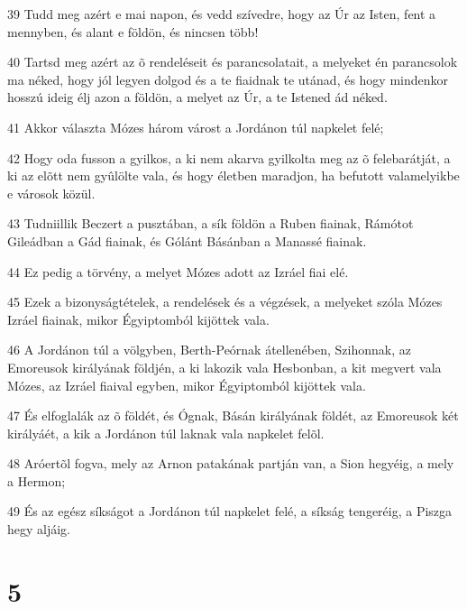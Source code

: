 \par 39 Tudd meg azért e mai napon, és vedd szívedre, hogy az Úr az Isten, fent a mennyben, és alant e földön, és nincsen több!
\par 40 Tartsd meg azért az õ rendeléseit és parancsolatait, a melyeket én parancsolok ma néked, hogy jól legyen dolgod és a te fiaidnak te utánad, és hogy mindenkor hosszú ideig élj azon a földön, a melyet az Úr, a te Istened ád néked.
\par 41 Akkor választa Mózes három várost a Jordánon túl napkelet felé;
\par 42 Hogy oda fusson a gyilkos, a ki nem akarva gyilkolta meg az õ felebarátját, a ki az elõtt nem gyûlölte vala, és hogy életben maradjon, ha befutott valamelyikbe e városok közül.
\par 43 Tudniillik Beczert a pusztában, a sík földön a Ruben fiainak, Rámótot Gileádban a Gád fiainak, és Gólánt Básánban a Manassé fiainak.
\par 44 Ez pedig a törvény, a melyet Mózes adott az Izráel fiai elé.
\par 45 Ezek a bizonyságtételek, a rendelések és a végzések, a melyeket szóla Mózes Izráel fiainak, mikor Égyiptomból kijöttek vala.
\par 46 A Jordánon túl a völgyben, Berth-Peórnak átellenében, Szihonnak, az Emoreusok királyának földjén, a ki lakozik vala Hesbonban, a kit megvert vala Mózes, az Izráel fiaival egyben, mikor Égyiptomból kijöttek vala.
\par 47 És elfoglalák az õ földét, és Ógnak, Básán királyának földét, az Emoreusok két királyáét, a kik a Jordánon túl laknak vala napkelet felõl.
\par 48 Aróertõl fogva, mely az Arnon patakának partján van, a Sion hegyéig, a mely a Hermon;
\par 49 És az egész síkságot a Jordánon túl napkelet felé, a síkság tengeréig, a Piszga hegy aljáig.

\chapter{5}


